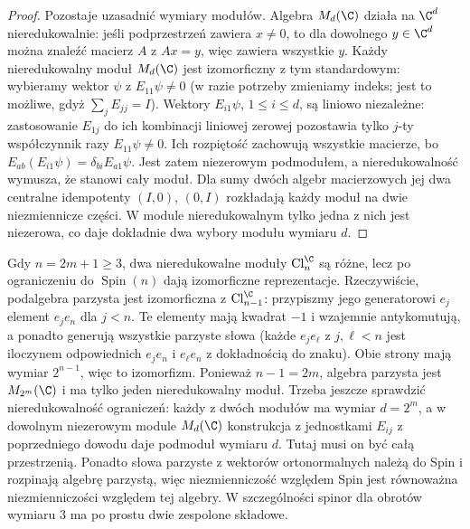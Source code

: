 \begin{proof}
Pozostaje uzasadnić wymiary modułów. Algebra
$M_d(\C)$ działa na $\C^d$ nieredukowalnie:
jeśli podprzestrzeń zawiera $x\ne0$, to
dla dowolnego $y\in\C^d$ można znaleźć
macierz $A$ z $Ax=y$, więc zawiera wszystkie $y$.
Każdy nieredukowalny moduł $M_d(\C)$ jest
izomorficzny z tym standardowym: wybieramy
wektor $\psi$ z $E_{11}\psi\ne0$ (w razie potrzeby
zmieniamy indeks; jest to możliwe, gdyż
$\sum_jE_{jj}=I$). Wektory
$E_{i1}\psi$, $1\leq i\leq d$, są liniowo
niezależne: zastosowanie $E_{1j}$ do ich
kombinacji liniowej zerowej pozostawia
tylko $j$-ty współczynnik razy
$E_{11}\psi\ne0$. Ich rozpiętość zachowują
wszystkie macierze, bo
$E_{ab}(E_{i1}\psi)=\delta_{bi}E_{a1}\psi$.
Jest zatem niezerowym podmodułem, a
nieredukowalność wymusza, że stanowi cały moduł.
Dla sumy dwóch algebr macierzowych jej
dwa centralne idempotenty $(I,0)$, $(0,I)$
rozkładają każdy moduł na dwie niezmiennicze
części. W module nieredukowalnym tylko jedna
z nich jest niezerowa, co daje dokładnie
dwa wybory modułu wymiaru $d$.
\end{proof}

\begin{uwaga}
Gdy $n=2m+1\geq3$, dwa nieredukowalne moduły
$\operatorname{Cl}^{\C}_n$ są różne, lecz
po ograniczeniu do $\operatorname{Spin}(n)$
dają izomorficzne reprezentacje.
Rzeczywiście, podalgebra parzysta jest
izomorficzna z
$\operatorname{Cl}^{\C}_{n-1}$: przypiszmy
jego generatorowi $e_j$ element $e_je_n$
dla $j<n$. Te elementy mają kwadrat $-1$
i wzajemnie antykomutują, a ponadto
generują wszystkie parzyste słowa
(każde $e_je_\ell$ z $j,\ell<n$ jest
iloczynem odpowiednich $e_je_n$ i $e_\ell e_n$
z dokładnością do znaku). Obie strony mają
wymiar $2^{n-1}$, więc to izomorfizm.
Ponieważ $n-1=2m$, algebra parzysta jest
$M_{2^m}(\C)$ i ma tylko jeden nieredukowalny
moduł. Trzeba jeszcze sprawdzić nieredukowalność ograniczeń:
każdy z dwóch modułów ma wymiar $d=2^m$, a w dowolnym
niezerowym module $M_d(\C)$ konstrukcja z jednostkami $E_{ij}$
z poprzedniego dowodu daje podmoduł wymiaru $d$.
Tutaj musi on być całą przestrzenią. Ponadto słowa parzyste
z wektorów ortonormalnych należą do Spin i rozpinają algebrę
parzystą, więc niezmienniczość względem Spin jest równoważna
niezmienniczości względem tej algebry.
W szczególności spinor dla obrotów
wymiaru $3$ ma po prostu dwie zespolone składowe.
\end{uwaga}

